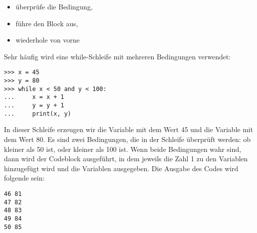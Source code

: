 {\renewcommand{\labelitemi}{$\triangleright$}
\begin{itemize}
\item überprüfe die Bedingung,
\item führe den Block aus,
\item wiederhole von vorne
\end{itemize}}

Sehr häufig wird eine while-Schleife mit mehreren Bedingungen verwendet:

\begin{listing}
\begin{verbatim}
>>> x = 45
>>> y = 80
>>> while x < 50 and y < 100:
...     x = x + 1
...     y = y + 1
...     print(x, y)
\end{verbatim}
\end{listing}

In dieser Schleife erzeugen wir die Variable  mit dem Wert 45 und die Variable  mit dem Wert 80. Es sind zwei Bedingungen, die in der Schleife überprüft werden: ob  kleiner als 50 ist, oder  kleiner als 100 ist. Wenn beide Bedingungen wahr sind, dann wird der Codeblock ausgeführt, in dem jeweils die Zahl 1 zu den Variablen hinzugefügt wird und die Variablen ausgegeben. Die Ausgabe des Codes wird folgende sein:

\begin{listing}
\begin{verbatim}
46 81
47 82
48 83
49 84
50 85
\end{verbatim}
\end{listing}

